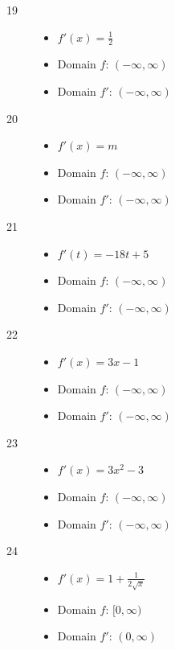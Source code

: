 \documentclass[letterpaper]{exam}
\begin{document}
\begin{description}
      \item[19]
        \begin{itemize}
          \item $f'(x) = \frac{1}{2}$
          \item Domain $f$: $(-\infty, \infty)$
          \item Domain $f'$: $(-\infty, \infty)$
        \end{itemize}

      \item[20]
        \begin{itemize}
          \item $f'(x) = m$
          \item Domain $f$: $(-\infty, \infty)$
          \item Domain $f'$: $(-\infty, \infty)$
        \end{itemize}

      \item[21]
        \begin{itemize}
          \item $f'(t) = -18t + 5$
          \item Domain $f$: $(-\infty, \infty)$
          \item Domain $f'$: $(-\infty, \infty)$
        \end{itemize}

      \newpage

      \item[22]
        \begin{itemize}
          \item $f'(x) = 3x - 1$
          \item Domain $f$: $(-\infty, \infty)$
          \item Domain $f'$: $(-\infty, \infty)$
        \end{itemize}

      \item[23]
        \begin{itemize}
          \item $f'(x) = 3x^2 - 3$
          \item Domain $f$: $(-\infty, \infty)$
          \item Domain $f'$: $(-\infty, \infty)$
        \end{itemize}

      \item[24]
        \begin{itemize}
          \item $f'(x) = 1 + \frac{1}{ 2 \sqrt{x} }$
          \item Domain $f$: $[ 0, \infty )$
          \item Domain $f'$: $( 0, \infty )$
        \end{itemize}


\end{description}
\end{document}
